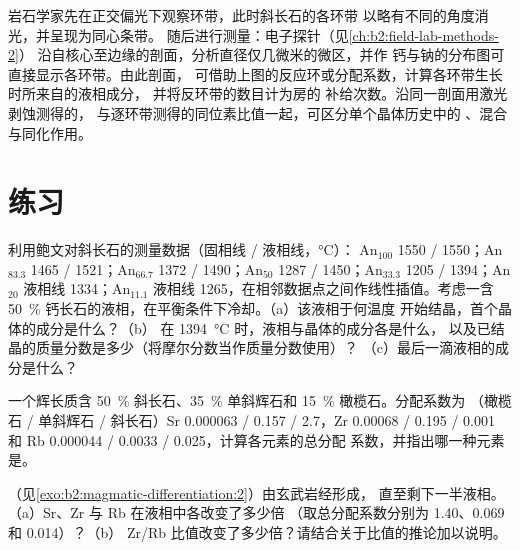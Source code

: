 \begin{inthelab}[读取环带晶体]
岩石学家先在正交偏光下观察环带，此时斜长石的各环带
以略有不同的角度消光，并呈现为同心条带。
随后进行测量：电子探针（见\cref{ch:b2:field-lab-methods-2}）
沿自核心至边缘的剖面，分析直径仅几微米的微区，并作
钙与钠的分布图可直接显示各环带。由此剖面，
可借助上图的反应环或分配系数，计算各环带生长时所来自的液相成分，
并将反环带的数目计为房的
补给次数。沿同一剖面用激光剥蚀测得的，
与逐环带测得的同位素比值一起，可区分单个晶体历史中的
、混合与同化作用。
\end{inthelab}

\section{练习}

\begin{exercise}[$\star$]\label{exo:b2:magmatic-differentiation:1}
利用鲍文对斜长石的测量数据（固相线 / 液相线，\unit{\celsius}）：
An$_{100}$ 1550 / 1550；An$_{83.3}$ 1465 / 1521；An$_{66.7}$ 1372 / 1490；An$_{50}$
1287 / 1450；An$_{33.3}$ 1205 / 1394；An$_{20}$ 液相线 1334；An$_{11.1}$ 液相线
1265，在相邻数据点之间作线性插值。考虑一含
\qty{50}{\percent} 钙长石的液相，在平衡条件下冷却。（a）该液相于何温度
开始结晶，首个晶体的成分是什么？（b）
在 \qty{1394}{\celsius} 时，液相与晶体的成分各是什么，
以及已结晶的质量分数是多少（将摩尔分数当作质量分数使用）？
（c）最后一滴液相的成分是什么？
\end{exercise}

\begin{exercise}[$\star$]\label{exo:b2:magmatic-differentiation:2}
一个辉长质含 \qty{50}{\percent} 斜长石、\qty{35}{\percent}
单斜辉石和 \qty{15}{\percent} 橄榄石。分配系数为
（橄榄石 / 单斜辉石 / 斜长石）Sr 0.000063 / 0.157 / 2.7，Zr 0.00068 /
0.195 / 0.001 和 Rb 0.000044 / 0.0033 / 0.025，计算各元素的总分配
系数，并指出哪一种元素是。
\end{exercise}

\begin{exercise}[$\star$]\label{exo:b2:magmatic-differentiation:3}
（见\cref{exo:b2:magmatic-differentiation:2}）由玄武岩经形成，
直至剩下一半液相。（a）Sr、Zr 与 Rb 在液相中各改变了多少倍
（取总分配系数分别为 1.40、0.069 和 0.014）？（b）
Zr/Rb 比值改变了多少倍？请结合关于比值的推论加以说明。
\end{exercise}

